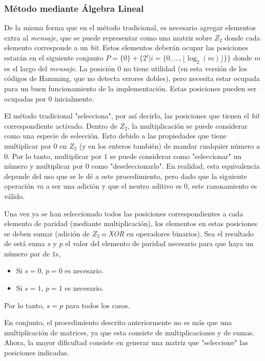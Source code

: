 \documentclass{article}
\begin{document}
\subsubsection{Método mediante Álgebra Lineal}

De la misma forma que en el método tradicional, es necesario agregar elementos extra al \textit{mensaje}, que se puede representar como una matriz sobre $Z_2$ donde cada elemento corresponde a un \textit{bit}. Estos elementos deberán ocupar las posiciones estarán en el siguiente conjunto  $ P = \{0\} + \{ 2^i | i=\{0, ..., \lfloor\log_2 (m)\rfloor\} \} $ donde $m$ es el largo del \textit{mensaje}. La posición $0$ no tiene utilidad (en esta versión de los códigos de Hamming, que no detecta errores dobles), pero necesita estar ocupada para un buen funcionamiento de la implementación. Estas posiciones pueden ser ocupadas por 0 inicialmente.

El método tradicional "selecciona", por así decirlo, las posiciones que tienen el \textit{bit} correspondiente activado. Dentro de $Z_2$, la multiplicación se puede considerar como una especie de selección. Esto debido a las propiedades que tiene multiplicar por $0$ en $Z_2$ (y en los enteros también) de mandar cualquier número a $0$. Por lo tanto, multiplicar por $1$ se puede considerar como "seleccionar" un número y multiplicar por $0$ como "deseleccionarlo". En realidad, esta equivalencia depende del uso que se le dé a este procedimiento, pero dado que la siguiente operación va a ser una adición y que el neutro aditivo es $0$, este razonamiento es válido.

Una vez ya se han seleccionado todos las posiciones correspondientes a cada elemento de paridad (mediante multiplicación), los elementos en estas posiciones se deben sumar (adición de $Z_2$ o \textit{XOR} en operadores binarios). Sea el resultado de está suma $s$ y $p$ el valor del elemento de paridad necesario para que haya un número par de $1$s,
\begin{itemize}
    \item Si $s = 0$, $p = 0$ es necesario.
    \item Si $s = 1$, $p = 1$ es necesario.
\end{itemize}
Por lo tanto, $s = p$ para todos los casos. 

En conjunto, el procedimiento descrito anteriormente no es más que una multiplicación de matrices, ya que esta consiste de multiplicaciones y de sumas. Ahora, la mayor dificultad consiste en generar una matriz que "seleccione" las posiciones indicadas.
\end{document}
